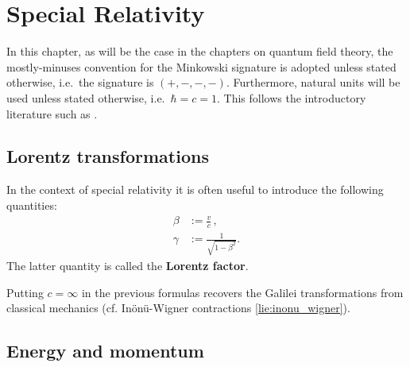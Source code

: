 \chapter{Special Relativity}

    In this chapter, as will be the case in the chapters on quantum field theory, the mostly-minuses convention for the Minkowski signature is adopted unless stated otherwise, i.e.~the signature is $(+,-,-,-)$. Furthermore, natural units will be used unless stated otherwise, i.e.~$\hbar = c = 1$. This follows the introductory literature such as \cite{Peskin, greiner_qft}.

\section{Lorentz transformations}

    \begin{notation}
        In the context of special relativity it is often useful to introduce the following quantities:
        \begin{align}
            \beta &:= \frac{v}{c}\,,\\
            \label{relativity:lorentz_factor}
            \gamma &:= \frac{1}{\sqrt{1 - \beta^2}}.
        \end{align}
        The latter quantity is called the \textbf{Lorentz factor}.
    \end{notation}
    \begin{remark}
        Putting $c=\infty$ in the previous formulas recovers the Galilei transformations from classical mechanics (cf. In\"on\"u-Wigner contractions \ref{lie:inonu_wigner}).
    \end{remark}

\section{Energy and momentum}

